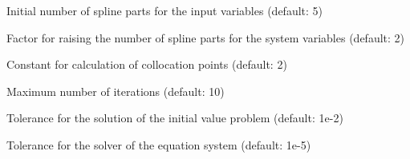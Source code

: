 \documentclass[letterpaper,10pt,english]{sphinxmanual}
\begin{document}
\begin{fulllineitems}

\begin{fulllineitems}
\label{pytrajectory:pytrajectory.trajectory.Trajectory.su}
Initial number of spline parts for the input variables (default: 5)

\end{fulllineitems}


\begin{fulllineitems}
\label{pytrajectory:pytrajectory.trajectory.Trajectory.kx}
Factor for raising the number of spline parts for the system variables (default: 2)

\end{fulllineitems}


\begin{fulllineitems}
\label{pytrajectory:pytrajectory.trajectory.Trajectory.delta}
Constant for calculation of collocation points (default: 2)

\end{fulllineitems}


\begin{fulllineitems}
\label{pytrajectory:pytrajectory.trajectory.Trajectory.maxIt}
Maximum number of iterations (default: 10)

\end{fulllineitems}


\begin{fulllineitems}
\label{pytrajectory:pytrajectory.trajectory.Trajectory.eps}
Tolerance for the solution of the initial value problem (default: 1e-2)

\end{fulllineitems}


\begin{fulllineitems}
\label{pytrajectory:pytrajectory.trajectory.Trajectory.tol}
Tolerance for the solver of the equation system (default: 1e-5)


\end{fulllineitems}
\end{fulllineitems}
\end{document}
